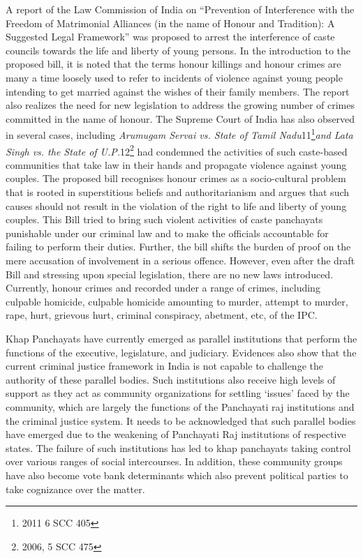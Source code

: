 \begin{multicols}{2}
\noi
A report of the Law Commission of India on “Prevention of Interference with the
Freedom of Matrimonial Alliances (in the name of Honour and Tradition): A Suggested
Legal Framework” was proposed to arrest the interference of caste councils towards the
life and liberty of young persons. In the introduction to the proposed bill, it is noted that
the terms honour killings and honour crimes are many a time loosely used to refer to
incidents of violence against young people intending to get married against the wishes
of their family members. The report also realizes the need for new legislation to address
the growing number of crimes committed in the name of honour. The Supreme Court
of India has also observed in several cases, including \textit{Arumugam Servai vs. State of
Tamil Nadu}11\footnote{ 2011 6 SCC 405}\textit{and Lata Singh vs. the State of U.P.}12\footnote{2006, 5 SCC 475} had condemned the activities of such
caste-based communities that take law in their hands and propagate violence against
young couples. The proposed bill recognises honour crimes as a socio-cultural problem
that is rooted in superstitious beliefs and authoritarianism and argues that such causes
should not result in the violation of the right to life and liberty of young couples. This
Bill tried to bring such violent activities of caste panchayats punishable under our
criminal law and to make the officials accountable for failing to perform their duties.
Further, the bill shifts the burden of proof on the mere accusation of involvement in a
serious offence. However, even after the draft Bill and stressing upon special
legislation, there are no new laws introduced. Currently, honour crimes and recorded
under a range of crimes, including culpable homicide, culpable homicide amounting to
murder, attempt to murder, rape, hurt, grievous hurt, criminal conspiracy, abetment, etc,
of the IPC. 


\noi
Khap Panchayats have currently emerged as parallel institutions that perform the
functions of the executive, legislature, and judiciary. Evidences also show that the
current criminal justice framework in India is not capable to challenge the authority of these parallel bodies. Such institutions also receive high levels of support as they act as
community organizations for settling ‘issues’ faced by the community, which are
largely the functions of the Panchayati raj institutions and the criminal justice system.
It needs to be acknowledged that such parallel bodies have emerged due to the
weakening of Panchayati Raj institutions of respective states. The failure of such
institutions has led to khap panchayats taking control over various ranges of social
intercourses. In addition, these community groups have also become vote bank
determinants which also prevent political parties to take cognizance over the matter.


\end{multicols}
